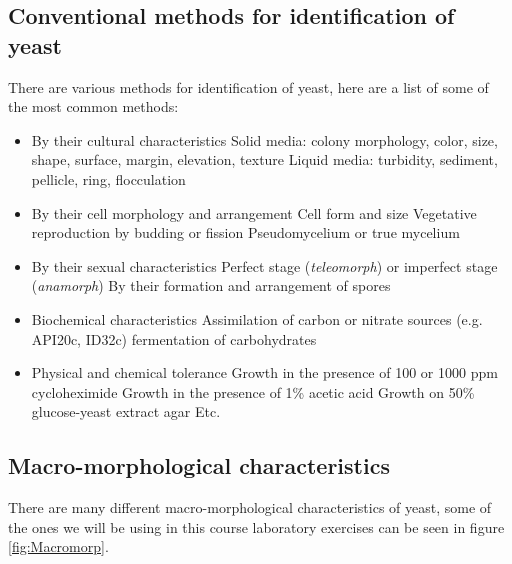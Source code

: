 \subsection{Conventional methods for identification of yeast}
There are various methods for identification of yeast, here are a list of some of the most common methods:
\begin{highlight}
    \begin{itemize}
        \item By their cultural characteristics
        \subitem Solid media: colony morphology, color, size, shape, surface, margin, elevation, texture
        \subitem Liquid media: turbidity, sediment, pellicle, ring, flocculation
        \item By their cell morphology and arrangement
        \subitem Cell form and size 
        \subitem Vegetative reproduction by budding or fission
        \subitem Pseudomycelium or true mycelium
        \item By their sexual characteristics
        \subitem Perfect stage (\textit{teleomorph}) or imperfect stage (\textit{anamorph})
        \subitem By their formation and arrangement of spores 
        \item Biochemical characteristics
        \subitem Assimilation of carbon or nitrate sources (e.g. API20c, ID32c)
        \subitem fermentation of carbohydrates
        \item Physical and chemical tolerance
        \subitem Growth in the presence of 100 or 1000 ppm cycloheximide
        \subitem Growth in the presence of 1\% acetic acid
        \subitem Growth on 50\% glucose-yeast extract agar
        \subitem Etc.
    \end{itemize}
\end{highlight}

\subsection{Macro-morphological characteristics}
There are many different macro-morphological characteristics of yeast, some of the ones we will be using in this course laboratory exercises can be seen in figure \ref{fig:Macromorp}.

